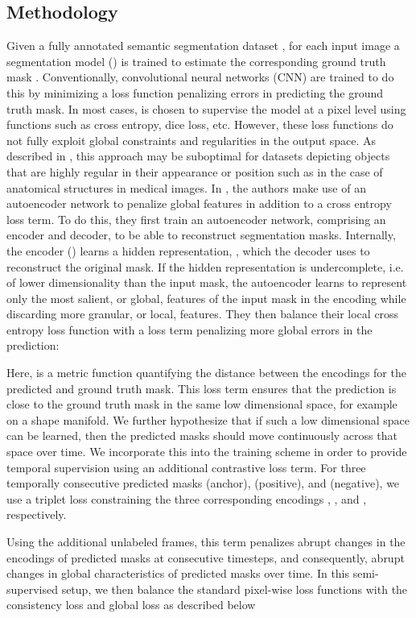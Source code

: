 \documentclass[twoside, print]{ieeecolor_arxiv}
\begin{document}
\subsection{Methodology}
Given a fully annotated semantic segmentation dataset , for each input image  a segmentation model () is trained to estimate the corresponding ground truth mask . Conventionally, convolutional neural networks (CNN) are trained to do this by minimizing a loss function  penalizing errors in predicting the ground truth mask. In most cases,  is chosen to supervise the model at a pixel level using functions such as cross entropy, dice loss, etc. However, these loss functions do not fully exploit global constraints and regularities in the output space. As described in \cite{acnn}, this approach may be suboptimal for datasets depicting objects that are highly regular in their appearance or position such as in the case of anatomical structures in medical images. In \cite{acnn}, the authors make use of an autoencoder network to penalize global features in addition to a cross entropy loss term. To do this, they first train an autoencoder network, comprising an encoder and decoder, to be able to reconstruct segmentation masks. Internally, the encoder () learns a hidden representation, , which the decoder uses to reconstruct the original mask. If the hidden representation is undercomplete, i.e. of lower dimensionality than the input mask, the autoencoder learns to represent only the most salient, or global, features of the input mask in the encoding while discarding more granular, or local, features. They then balance their local cross entropy loss function with a loss term penalizing more global errors in the prediction:



Here,  is a metric function quantifying the distance between the encodings for the predicted and ground truth mask. This loss term ensures that the prediction is close to the ground truth mask in the same low dimensional space, for example on a shape manifold. We further hypothesize that if such a low dimensional space can be learned, then the predicted masks should move continuously across that space over time. We incorporate this into the training scheme in order to provide temporal supervision using an additional contrastive loss term. For three temporally consecutive predicted masks (anchor), (positive), and (negative), we use a triplet loss constraining the three corresponding encodings , , and , respectively. 


Using the additional unlabeled frames, this term penalizes abrupt changes in the encodings of predicted masks at consecutive timesteps, and consequently, abrupt changes in global characteristics of predicted masks over time. In this semi-supervised setup, we then balance the standard pixel-wise loss functions with the consistency loss and global loss as described below
\end{document}
